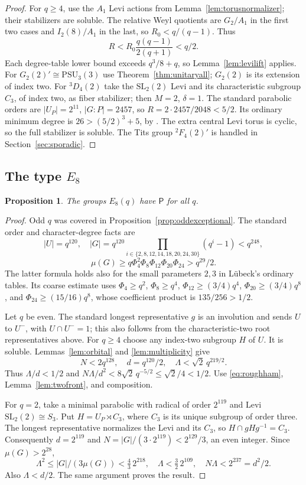 \documentclass[11pt]{article}
\newtheorem{proposition}[theorem]{Proposition}
\theoremstyle{definition}
\newcommand{\Pp}{\mathsf P}
\newcommand{\SL}{\mathrm{SL}}
\newcommand{\PSU}{\mathrm{PSU}}
\begin{document}
\begin{proof}
For $q\ge4$, use the $A_1$ Levi actions from Lemma~\ref{lem:torusnormalizer}; their stabilizers are soluble. The relative Weyl quotients are $G_2/A_1$ in the first two cases and $I_2(8)/A_1$ in the last, so $R_0<q/(q-1)$. Thus
\[
R<R_0\frac{q(q-1)}{2(q+1)}<q/2.
\]
Each degree-table lower bound exceeds $q^3/8+q$, so Lemma~\ref{lem:levilift} applies. For $G_2(2)'\cong\PSU_3(3)$ use Theorem~\ref{thm:unitaryall}; $G_2(2)$ is its extension of index two. For $^3D_4(2)$ take the $\SL_2(2)$ Levi and its characteristic subgroup $C_3$, of index two, as fiber stabilizer; then $M=2$, $\delta=1$. The standard parabolic orders are $|U_P|=2^{11}$, $|G:P|=2457$, so $R=2\cdot2457/2048<5/2$. Its ordinary minimum degree is $26>(5/2)^3+5$, by \cite[Section 5.4]{Lubeck}. The extra central Levi torus is cyclic, so the full stabilizer is soluble. The Tits group $^2F_4(2)'$ is handled in Section~\ref{sec:sporadic}.
\end{proof}

\subsection{The type \texorpdfstring{$E_8$}{E8}}
\begin{proposition}\label{prop:e8}
The groups $E_8(q)$ have $\Pp$ for all $q$.
\end{proposition}
\begin{proof}
Odd $q$ was covered in Proposition~\ref{prop:oddexceptional}. The standard order and character-degree facts \cite{CarterFinite,Lubeck} are
\[
|U|=q^{120},\quad |G|=q^{120}\prod_{i\in\{2,8,12,14,18,20,24,30\}}(q^i-1)<q^{248},
\]
\[
\mu(G)\ge q\Phi_4^2\Phi_8\Phi_{12}\Phi_{20}\Phi_{24}>q^{29}/2.
\]
The latter formula holds also for the small parameters $2,3$ in L\"ubeck's ordinary tables. Its coarse estimate uses $\Phi_4\ge q^2$, $\Phi_8\ge q^4$, $\Phi_{12}\ge(3/4)q^4$, $\Phi_{20}\ge(3/4)q^8$, and $\Phi_{24}\ge(15/16)q^8$, whose coefficient product is $135/256>1/2$.

Let $q$ be even. The standard longest representative $g$ is an involution and sends $U$ to $U^-$, with $U\cap U^-=1$; this also follows from the characteristic-two root representatives above. For $q\ge4$ choose any index-two subgroup $H$ of $U$. It is soluble. Lemmas~\ref{lem:orbital} and \ref{lem:multiplicity} give
\[
N<2q^{128},\quad d=q^{120}/2,\quad
\Lambda<\sqrt2\,q^{219/2}.
\]
Thus $\Lambda/d<1/2$ and $N\Lambda/d^2<8\sqrt2\,q^{-5/2}\le\sqrt2/4<1/2$. Use \eqref{eq:roughham}, Lemma~\ref{lem:twofront}, and composition.

For $q=2$, take a minimal parabolic with radical of order $2^{119}$ and Levi $\SL_2(2)\cong S_3$. Put $H=U_P\rtimes C_3$, where $C_3$ is its unique subgroup of order three. The longest representative normalizes the Levi and its $C_3$, so $H\cap gHg^{-1}=C_3$. Consequently $d=2^{119}$ and $N=|G|/(3\cdot2^{119})<2^{129}/3$, an even integer. Since $\mu(G)>2^{28}$,
\[
\Lambda^2\le |G|/(3\mu(G))<\tfrac43\,2^{218},\quad
\Lambda<\tfrac32\,2^{109},\quad N\Lambda<2^{237}=d^2/2.
\]
Also $\Lambda<d/2$. The same argument proves the result.
\end{proof}
\end{document}
